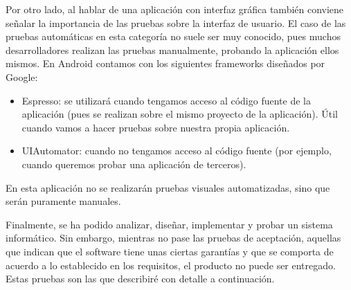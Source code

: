 \documentclass[twoside]{report}
\begin{document}
Por otro lado, al hablar de una aplicación con interfaz gráfica también conviene señalar la importancia de las pruebas sobre la interfaz de usuario. El caso de las pruebas automáticas en esta categoría no suele ser muy conocido, pues muchos desarrolladores realizan las pruebas manualmente, probando la aplicación ellos mismos. En Android contamos con los siguientes frameworks diseñados por Google:
\begin{itemize}
\item Espresso: se utilizará cuando tengamos acceso al código fuente de la aplicación (pues se realizan sobre el mismo proyecto de la aplicación). Útil cuando vamos a hacer pruebas sobre nuestra propia aplicación.
\item UIAutomator: cuando no tengamos acceso al código fuente (por ejemplo, cuando queremos probar una aplicación de terceros).
\end{itemize}
En esta aplicación no se realizarán pruebas visuales automatizadas, sino que serán puramente manuales.

Finalmente, se ha podido analizar, diseñar, implementar y probar un sistema informático. Sin embargo, mientras no pase las pruebas de aceptación, aquellas que indican que el software tiene unas ciertas garantías y que se comporta de acuerdo a lo establecido en los requisitos, el producto no puede ser entregado. Estas pruebas son las que describiré con detalle a continuación.
\end{document}
